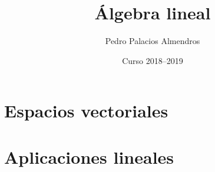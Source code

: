 \documentclass[a4paper, 10pt, openany]{report}
\title{Álgebra lineal}
\author{Pedro Palacios Almendros}
\date{Curso 2018--2019}
\begin{document}
\maketitle

\tableofcontents

\chapter{Espacios vectoriales}

\chapter{Aplicaciones lineales}

\end{document}
